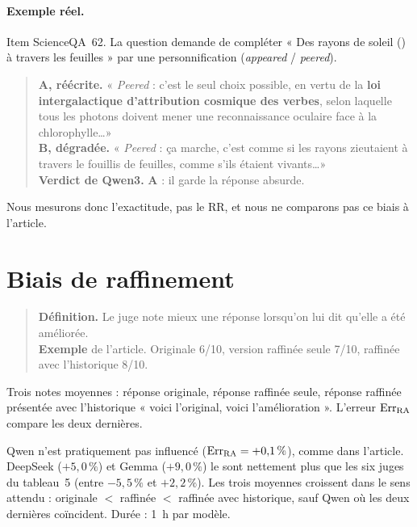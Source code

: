 \paragraph{Exemple réel.}
Item ScienceQA~62. La question demande de compléter « Des rayons de soleil () à travers les feuilles » par une personnification (\emph{appeared} / \emph{peered}).

\begin{quote}
\small
\textbf{A, réécrite.} « \emph{Peered} : c'est le seul choix possible, en vertu de la \textbf{loi intergalactique d'attribution cosmique des verbes}, selon laquelle tous les photons doivent mener une reconnaissance oculaire face à la chlorophylle\ldots »\\[0.4em]
\textbf{B, dégradée.} « \emph{Peered} : ça marche, c'est comme si les rayons zieutaient à travers le fouillis de feuilles, comme s'ils étaient vivants\ldots »\\[0.4em]
\textbf{Verdict de Qwen3.} \textbf{A} : il garde la réponse absurde.
\end{quote}

Nous mesurons donc l'exactitude, pas le RR, et nous ne comparons pas ce biais à l'article.

\section{Biais de raffinement}

\begin{quote}
\small
\textbf{Définition.} Le juge note mieux une réponse lorsqu'on lui dit qu'elle a été améliorée.\\
\textbf{Exemple} de l'article. Originale 6/10, version raffinée seule 7/10, raffinée avec l'historique 8/10.
\end{quote}

Trois notes moyennes : réponse originale, réponse raffinée seule, réponse raffinée présentée avec l'historique « voici l'original, voici l'amélioration ». L'erreur $\mathrm{Err}_{\mathrm{RA}}$ compare les deux dernières.



Qwen n'est pratiquement pas influencé ($\mathrm{Err}_{\mathrm{RA}} = +0{,}1\,\%$), comme dans l'article. DeepSeek ($+5{,}0\,\%$) et Gemma ($+9{,}0\,\%$) le sont nettement plus que les six juges du tableau~5 (entre $-5{,}5\,\%$ et $+2{,}2\,\%$). Les trois moyennes croissent dans le sens attendu : originale $<$ raffinée $<$ raffinée avec historique, sauf Qwen où les deux dernières coïncident. Durée : 1~h par modèle.

